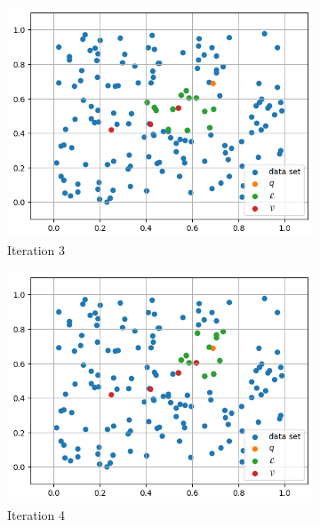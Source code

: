 \begin{figure}[ht]
    \hfill
    \begin{subfigure}{0.31\textwidth}
        \includegraphics[width=\textwidth]{images/greedy-search-3}
        \caption{Iteration 3}
    \end{subfigure}
    \hfill
    \begin{subfigure}{0.31\textwidth}
        \includegraphics[width=\textwidth]{images/greedy-search-4}
        \caption{Iteration 4}
    \end{subfigure}
    \hfill
    \begin{subfigure}{0.31\textwidth}

\end{subfigure}
\end{figure}
